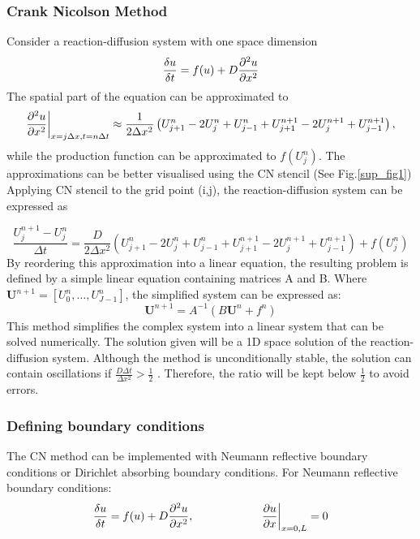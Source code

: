 \subsubsection*{Crank Nicolson Method}\label{cranknicolson}
Consider a reaction-diffusion system with one space dimension
\begin{equation}
    \frac{\delta u}{\delta t} =  f(u) + D\frac{\partial^{2} {u}}{\partial {x}^{2}}
\end{equation}
The spatial part of the equation can be approximated to
\begin{equation}
    \frac{\partial^{2} {u}}{\partial {x}^{2}} \biggr\rvert_{x=j\Delta x,t=n\Delta t} \approx \frac{1}{2\Delta x^{2}}\left( U^{n}_{j+1} -  2U^{n}_{j} + U^{n}_{j-1} + U^{n+1}_{j+1} - 2U^{n+1}_{j} + U^{n+1}_{j-1}\right),
\end{equation}
while the production function can be approximated to $f ( U^{n}_{j})$. The approximations can be better visualised using the CN stencil (See Fig.\ref{sup_fig1})
Applying CN stencil to the grid point (i,j), the reaction-diffusion system can be expressed as

\begin{equation}
    \frac{U^{n+1}_{j} - U^{n}_{j}}{\Delta t} = \frac{D}{2\Delta x^{2}}\left( U^{n}_{j+1} -  2U^{n}_{j} + U^{n}_{j-1} + U^{n+1}_{j+1} - 2U^{n+1}_{j} + U^{n+1}_{j-1}\right) +  f( U^{n}_{j})
    \label{CN_stencil}
\end{equation}
By reordering this approximation into a linear equation, the resulting problem is defined by a simple linear equation containing matrices A and B. Where $\textbf{U}^{n+1} = [U^{n}_{0}, \ldots , U^{n}_{J-1}]$, the simplified system can be expressed as:
\begin{equation}
    \textbf{U}^{n+1} = A^{-1}(B\textbf{U}^{n} + f^{n})
\end{equation}
This method simplifies the complex system into a linear system that can be solved numerically. The solution given will be a 1D space solution of the reaction-diffusion system. Although the method is unconditionally stable, the solution can contain oscillations if $ \frac{D\Delta t}{\Delta x^{2}} >\frac{1}{2} $ \parencite{trefethen1996finite}. Therefore, the ratio will be kept below $\frac{1}{2}$ to avoid errors.

\subsubsection*{Defining boundary conditions}\label{methods_boundary_conditions_CN}
The CN method can be implemented with Neumann reflective boundary conditions or Dirichlet absorbing boundary conditions.
For Neumann reflective boundary conditions:
\begin{equation}
    \frac{\delta u}{\delta t} =  f(u) + D\frac{\partial^{2} {u}}{\partial {x}^{2}},   \quad \quad \quad \quad \quad \quad \pdv{u}{x}\biggr\rvert_{x=0,L}=0
\end{equation}


